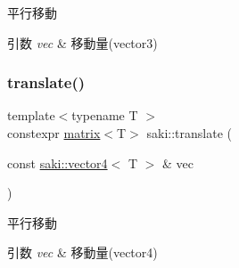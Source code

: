 平行移動 


\begin{DoxyParams}{引数}
{\em vec} & 移動量(vector3) \\
\hline
\end{DoxyParams}
\mbox{\label{namespacesaki_abdd23c2e56d1500ae2e8b662c5ddcf7c}} 
\subsubsection{\texorpdfstring{translate()}{translate()}\hspace{0.1cm}{\footnotesize\ttfamily [3/3]}}
{\footnotesize\ttfamily template$<$typename T $>$ \\
constexpr \mbox{\hyperlink{classsaki_1_1matrix}{matrix}}$<$T$>$ saki\+::translate (\begin{DoxyParamCaption}\item[{const \mbox{\hyperlink{classsaki_1_1vector4}{saki\+::vector4}}$<$ T $>$ \&}]{vec }\end{DoxyParamCaption})}



平行移動 


\begin{DoxyParams}{引数}
{\em vec} & 移動量(vector4) \\
\hline
\end{DoxyParams}
